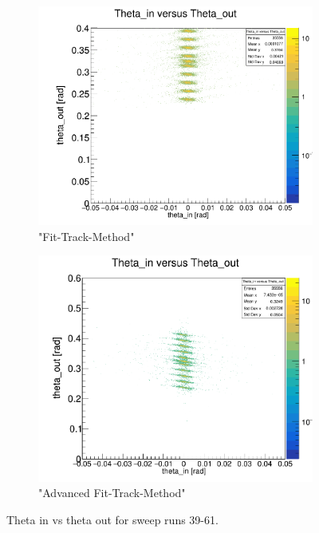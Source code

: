 \documentclass[12pt, letterpaper]{article}
\begin{document}
\begin{figure}[!htbp]
\begin{subfigure}{.5\textwidth}
  \label{fig:sub-second}
\end{subfigure}
\begin{subfigure}{.5\textwidth}
  \centering
  \includegraphics[width=.9\linewidth]{plot_imgs/theta_in_theta_out_fit.png} 
  \caption{"Fit-Track-Method"}
  \label{fig:sub-second}
\end{subfigure}
\begin{subfigure}{.5\textwidth}
  \centering
  \includegraphics[width=.9\linewidth]{plot_imgs/theta_in_theta_out_alpha.png} 
  \caption{"Advanced Fit-Track-Method"}
  \label{fig:sub-second}
\end{subfigure}
\caption{Theta \textunderscore in vs theta \textunderscore out for sweep runs 39-61.}
\label{fig:fig}
\end{figure}
\FloatBarrier
\clearpage
\end{document}
